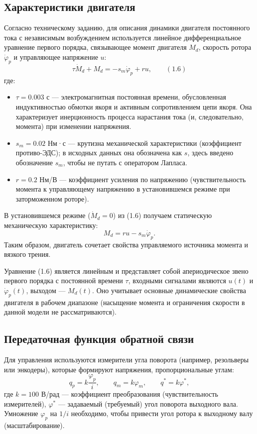 \documentclass[a4paper, 14pt]{extarticle}
\begin{document}
    \subsection{Характеристики двигателя}
    Согласно техническому заданию, для описания динамики двигателя постоянного тока с независимым возбуждением используется линейное дифференциальное уравнение первого порядка, связывающее момент двигателя $M_d$, скорость ротора $\dot{\varphi}_p$ и управляющее напряжение $u$:
    \[
    \tau \dot{M}_d + M_d = -s_m \dot{\varphi}_p + r u, \qquad (1.6)
    \]
    где:
    \begin{itemize}
    \item $\tau = 0.003$ с — электромагнитная постоянная времени, обусловленная индуктивностью обмотки якоря и активным сопротивлением цепи якоря. Она характеризует инерционность процесса нарастания тока (и, следовательно, момента) при изменении напряжения.
    \item $s_m = 0.02$ Нм·с — крутизна механической характеристики (коэффициент противо-ЭДС); в исходных данных она обозначена как $s$, здесь введено обозначение $s_m$, чтобы не путать с оператором Лапласа.
    \item $r = 0.2$ Нм/В — коэффициент усиления по напряжению (чувствительность момента к управляющему напряжению в установившемся режиме при заторможенном роторе).
    \end{itemize}
    В установившемся режиме ($\dot{M}_d = 0$) из (1.6) получаем статическую механическую характеристику:
    \[
    M_d = r u - s_m \dot{\varphi}_p.
    \]
    Таким образом, двигатель сочетает свойства управляемого источника момента и вязкого трения.

    Уравнение (1.6) является линейным и представляет собой апериодическое звено первого порядка с постоянной времени $\tau$, входными сигналами являются $u(t)$ и $\dot{\varphi}_p(t)$, выходом — $M_d(t)$. Оно учитывает основные динамические свойства двигателя в рабочем диапазоне (насыщение момента и ограничения скорости в данной модели не рассматриваются).

    \subsection{Передаточная функция обратной связи}
    Для управления используются измерители угла поворота (например, резольверы или энкодеры), которые формируют напряжения, пропорциональные углам:
    \[
    q_p = k\frac{\varphi_p}{i}, \qquad q_m = k\varphi_m, \qquad q^* = k\varphi^*,
    \]
    где $k = 100$ В/рад — коэффициент преобразования (чувствительность измерителей), $\varphi^*$ — задаваемый (требуемый) угол поворота выходного вала. Умножение $\varphi_p$ на $1/i$ необходимо, чтобы привести угол ротора к выходному валу (масштабирование).
\end{document}
